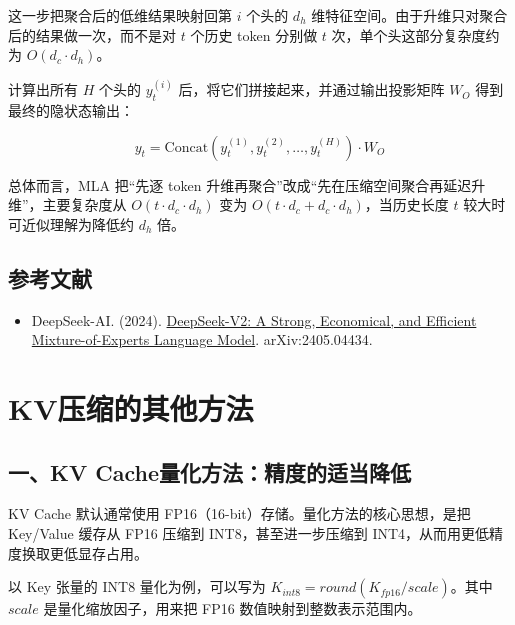 这一步把聚合后的低维结果映射回第 \(i\) 个头的 \(d_h\) 维特征空间。由于升维只对聚合后的结果做一次，而不是对 \(t\) 个历史 token 分别做 \(t\) 次，单个头这部分复杂度约为 \(O(d_c \cdot d_h)\)。

计算出所有 \(H\) 个头的 \(y_t^{(i)}\) 后，将它们拼接起来，并通过输出投影矩阵 \(W_O\) 得到最终的隐状态输出：

\[
y_t
=
\mathrm{Concat}\left(y_t^{(1)}, y_t^{(2)}, \ldots, y_t^{(H)}\right) \cdot W_O
\]

总体而言，MLA 把``先逐 token 升维再聚合''改成``先在压缩空间聚合再延迟升维''，主要复杂度从 \(O(t \cdot d_c \cdot d_h)\) 变为 \(O(t \cdot d_c + d_c \cdot d_h)\)，当历史长度 \(t\) 较大时可近似理解为降低约 \(d_h\) 倍。

\hypertarget{ux53c2ux8003ux6587ux732e-94}{%
\subsection{参考文献}\label{ux53c2ux8003ux6587ux732e-94}}

\begin{itemize}
\tightlist
\item
  DeepSeek-AI. (2024). \href{https://arxiv.org/abs/2405.04434}{DeepSeek-V2: A Strong, Economical, and Efficient Mixture-of-Experts Language Model}. arXiv:2405.04434.
\end{itemize}

\clearpage

\hypertarget{kvux538bux7f29ux7684ux5176ux4ed6ux65b9ux6cd5}{%
\section{KV压缩的其他方法}\label{kvux538bux7f29ux7684ux5176ux4ed6ux65b9ux6cd5}}

\hypertarget{ux4e00kv-cacheux91cfux5316ux65b9ux6cd5ux7cbeux5ea6ux7684ux9002ux5f53ux964dux4f4e}{%
\subsection{一、KV Cache量化方法：精度的适当降低}\label{ux4e00kv-cacheux91cfux5316ux65b9ux6cd5ux7cbeux5ea6ux7684ux9002ux5f53ux964dux4f4e}}

KV Cache 默认通常使用 FP16（16-bit）存储。量化方法的核心思想，是把 Key/Value 缓存从 FP16 压缩到 INT8，甚至进一步压缩到 INT4，从而用更低精度换取更低显存占用。

以 Key 张量的 INT8 量化为例，可以写为 \(K_{int8}=round(K_{fp16}/scale)\)。其中 \(scale\) 是量化缩放因子，用来把 FP16 数值映射到整数表示范围内。

